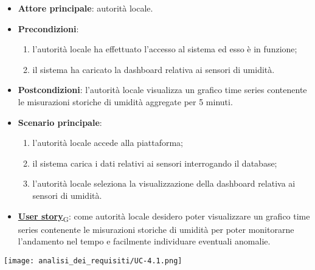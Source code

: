 \begin{itemize}
	\item \textbf{Attore principale}: autorità locale.
	\item \textbf{Precondizioni}:
	      \begin{enumerate}
		      \item l'autorità locale ha effettuato l'accesso al sistema ed esso è in funzione;
		      \item il sistema ha caricato la dashboard relativa ai sensori di umidità.
	      \end{enumerate}
	\item \textbf{Postcondizioni}: l'autorità locale visualizza un grafico time series contenente le misurazioni storiche di umidità aggregate per 5 minuti.
	\item \textbf{Scenario principale}:
	      \begin{enumerate}
		      \item l'autorità locale accede alla piattaforma;
		      \item il sistema carica i dati relativi ai sensori interrogando il database;
		      \item l'autorità locale seleziona la visualizzazione della dashboard relativa ai sensori di umidità.
	      \end{enumerate}
	\item \href{https://7last.github.io/docs/rtb/documentazione-interna/glossario\#user-story}{\textbf{User story}\textsubscript{G}}:
	      come autorità locale desidero poter visualizzare un grafico time series contenente le misurazioni storiche
	      di umidità per poter monitorarne l'andamento nel tempo e facilmente individuare eventuali anomalie.
\end{itemize}
\begin{center}
	\texttt{[image: analisi\_dei\_requisiti/UC-4.1.png]}
\end{center}


